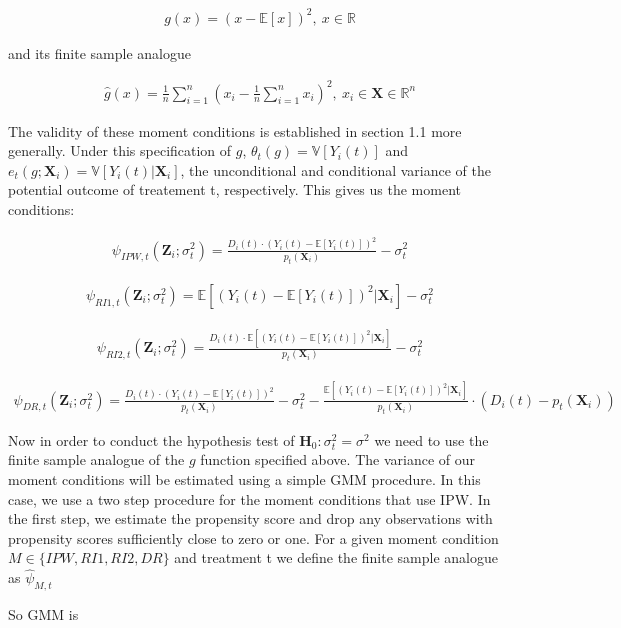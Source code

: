 \documentclass[12pt]{article}
\newcommand{\R}{\mathbb{R}}
\newcommand{\E}{\mathbb{E}}
\newcommand{\V}{\mathbb{V}}
\newcommand{\X}{\mathbf{X}}
\newcommand{\qsum}{\sum\limits_{i=1}^n}
\begin{document}
\begin{align*}
  g(x)= (x - \E[x])^2, \ x \in \R
\end{align*}

and its finite sample analogue

\begin{align*}
  \hat g(x)= \frac{1}{n}\qsum(x_i - \frac{1}{n}\qsum x_i)^2 , \ x_i \in \X \in \R^n
\end{align*}

The validity of these moment conditions is established in section 1.1 more generally.
Under this specification of $g$, $\theta_t(g) = \V[Y_i(t)]$ and $e_t(g;\X_i) = \V[Y_i(t)|\X_i]$, the unconditional and conditional variance of the potential outcome of treatement t, respectively. This gives us the moment conditions:

\begin{align*}
\psi_{IPW,t}(\mathbf{Z}_i;\sigma_t^2) = \frac{D_i(t)\cdot   (Y_i(t) - \E[Y_i(t)])^2 }{p_t(\X_i)} - \sigma_t^2
\end{align*}

\begin{align*}
\psi_{RI1,t}(\mathbf{Z}_i;\sigma_t^2) =  \E[(Y_i(t) - \E[Y_i(t)])^2 | \X_i] - \sigma_t^2
\end{align*}

\begin{align*}
\psi_{RI2,t}(\mathbf{Z}_i;\sigma_t^2) =  \frac{D_i(t) \cdot \E[(Y_i(t) - \E[Y_i(t)])^2 | \X_i]}{p_t(\X_i)}- \sigma_t^2
\end{align*}

\begin{align*}
\psi_{DR,t}(\mathbf{Z}_i;\sigma_t^2) =  \frac{D_i(t) \cdot (Y_i(t) - \E[Y_i(t)])^2}{p_t(\X_i)}- \sigma_t^2-  \frac{\E[(Y_i(t) - \E[Y_i(t)])^2 | \X_i]}{p_t(\X_i)} \cdot (D_i(t) -  p_t(\X_i))
\end{align*}


Now in order to conduct the hypothesis test of $\mathbf{H}_0 : \sigma^2_t = \sigma^2$ we need to use the finite sample analogue of the $g$ function specified above. The variance of our moment conditions will be estimated using a simple GMM procedure. In this case, we use a two step procedure for the moment conditions that use IPW. In the first step, we estimate the propensity score and drop any observations with propensity scores sufficiently close to zero or one. For a given moment condition $M \in \{IPW,RI1,RI2,DR \} $  and treatment t we define the finite sample analogue as $\hat\psi_{M,t}$

So GMM is
\end{document}
